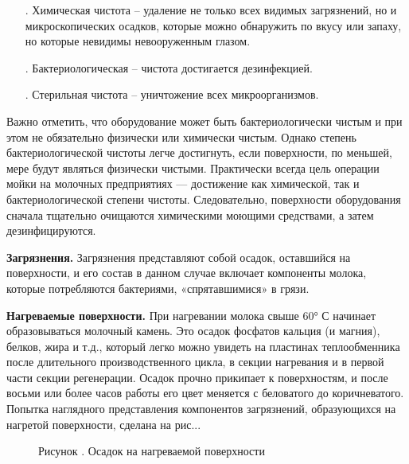 {\begin{itemize}[leftmargin=2.15cm, labelwidth=0.65cm, labelsep=0.0cm]
	\item[\theitemcntr. ] Химическая чистота {--} удаление не только всех видимых загрязнений, но и микроскопических осадков, которые можно обнаружить по вкусу или запаху, но которые невидимы невооруженным глазом.
	\addtocounter{itemcntr}{1}
	
	\item[\theitemcntr. ] Бактериологическая {--} чистота достигается дезинфекцией.
	\addtocounter{itemcntr}{1}
	
	\item[\theitemcntr. ] Стерильная чистота {--} уничтожение всех микроорганизмов.
	\addtocounter{itemcntr}{1}
	
	\setcounter{itemcntr}{1}
\end{itemize}

\par \redline Важно отметить, что оборудование может быть бактериологически чистым и при этом не
обязательно физически или химически чистым. Однако степень бактериологической чистоты
легче достигнуть, если поверхности, по меньшей, мере будут являться физически чистыми.
Практически всегда цель операции мойки на молочных предприятиях — достижение как
химической, так и бактериологической степени чистоты. Следовательно, поверхности
оборудования сначала тщательно очищаются химическими моющими средствами, а затем
дезинфицируются.


\par \redline \textbf{Загрязнения.} Загрязнения представляют собой осадок, оставшийся на поверхности, и его состав в данном случае включает компоненты молока, которые потребляются бактериями, «спрятавшимися» в грязи.

\par \redline \textbf{Нагреваемые поверхности.} При нагревании молока свыше 60° С начинает образовываться молочный камень.
Это осадок фосфатов кальция (и магния), белков, жира и т.д., который легко можно увидеть на пластинах теплообменника после длительного производственного цикла, в секции нагревания и в первой части секции регенерации. Осадок прочно прикипает к поверхностям, и после восьми или более часов работы его цвет меняется с беловатого до коричневатого. Попытка наглядного представления компонентов загрязнений, образующихся на нагретой поверхности, сделана на рис.\thechaptercntr .\theimagecntr.

\begin{figure}[htb]
	\centering
	\def\svgwidth{\textwidth}
	
	\caption*{\gostFont Рисунок \thechaptercntr .\theimagecntr \spc {--} Осадок на нагреваемой поверхности}
	\label{fig:ris1}
\end{figure}

}
